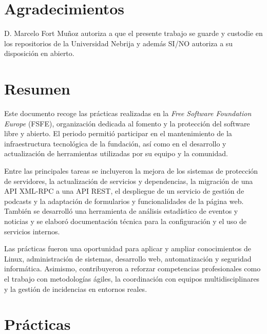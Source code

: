 \documentclass[11pt,a4paper]{article}
\begin{document}
    \section*{Agradecimientos}\label{sec:agradecimientos}

    \clearpage

    D. Marcelo Fort Muñoz autoriza a que el presente trabajo se guarde y custodie en los repositorios de la Universidad Nebrija y además SI/NO autoriza a su disposición en abierto.
    \pagebreak

    \tableofcontents
    \clearpage

    \listoffigures
    \clearpage

    \listoftables
    \clearpage



    \section{Resumen}\label{sec:resumen}
    Este documento recoge las prácticas realizadas en la \textit{Free Software Foundation Europe} (FSFE),
    organización dedicada al fomento y la protección del software libre y abierto.
    El periodo permitió participar en el mantenimiento de la infraestructura tecnológica de la fundación,
    así como en el desarrollo y actualización de herramientas utilizadas por su equipo y la comunidad.

    Entre las principales tareas se incluyeron la mejora de los sistemas de protección de servidores,
    la actualización de servicios y dependencias, la migración de una API XML-RPC a una API REST,
    el despliegue de un servicio de gestión de podcasts y la adaptación de formularios y funcionalidades
    de la página web. También se desarrolló una herramienta de análisis estadístico de eventos y noticias
    y se elaboró documentación técnica para la configuración y el uso de servicios internos.

    Las prácticas fueron una oportunidad para aplicar y ampliar conocimientos de Linux, administración
    de sistemas, desarrollo web, automatización y seguridad informática. Asimismo, contribuyeron a reforzar
    competencias profesionales como el trabajo con metodologías ágiles, la coordinación con equipos
    multidisciplinares y la gestión de incidencias en entornos reales.

    \section{Prácticas}\label{sec:practicas}
    
\end{document}
